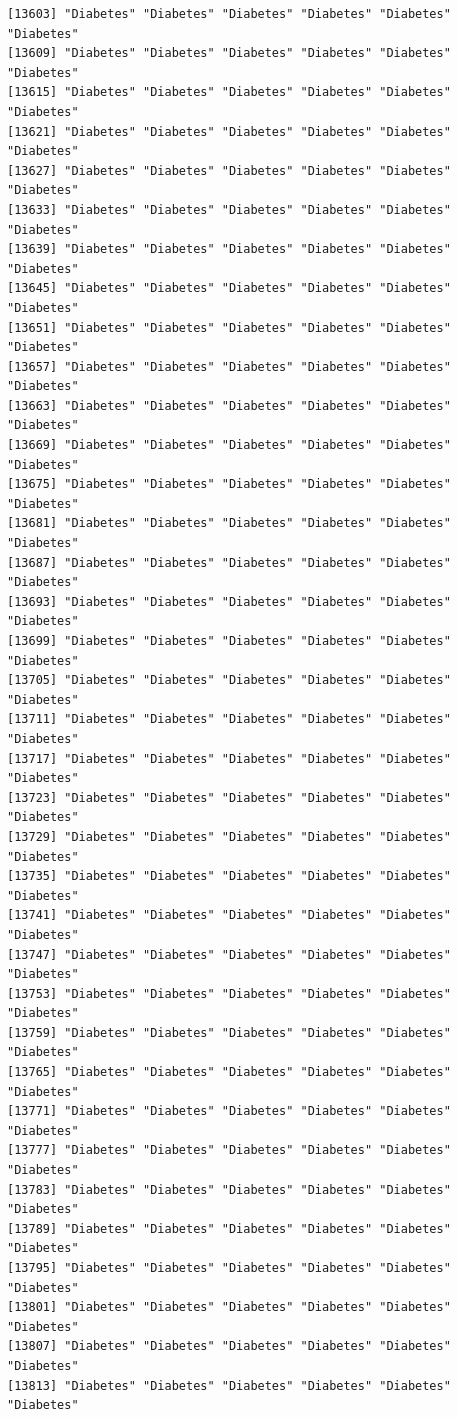 \documentclass[
  letterpaper,
  DIV=11,
  numbers=noendperiod]{scrartcl}
\begin{document}
\begin{verbatim}
[13603] "Diabetes" "Diabetes" "Diabetes" "Diabetes" "Diabetes" "Diabetes"
[13609] "Diabetes" "Diabetes" "Diabetes" "Diabetes" "Diabetes" "Diabetes"
[13615] "Diabetes" "Diabetes" "Diabetes" "Diabetes" "Diabetes" "Diabetes"
[13621] "Diabetes" "Diabetes" "Diabetes" "Diabetes" "Diabetes" "Diabetes"
[13627] "Diabetes" "Diabetes" "Diabetes" "Diabetes" "Diabetes" "Diabetes"
[13633] "Diabetes" "Diabetes" "Diabetes" "Diabetes" "Diabetes" "Diabetes"
[13639] "Diabetes" "Diabetes" "Diabetes" "Diabetes" "Diabetes" "Diabetes"
[13645] "Diabetes" "Diabetes" "Diabetes" "Diabetes" "Diabetes" "Diabetes"
[13651] "Diabetes" "Diabetes" "Diabetes" "Diabetes" "Diabetes" "Diabetes"
[13657] "Diabetes" "Diabetes" "Diabetes" "Diabetes" "Diabetes" "Diabetes"
[13663] "Diabetes" "Diabetes" "Diabetes" "Diabetes" "Diabetes" "Diabetes"
[13669] "Diabetes" "Diabetes" "Diabetes" "Diabetes" "Diabetes" "Diabetes"
[13675] "Diabetes" "Diabetes" "Diabetes" "Diabetes" "Diabetes" "Diabetes"
[13681] "Diabetes" "Diabetes" "Diabetes" "Diabetes" "Diabetes" "Diabetes"
[13687] "Diabetes" "Diabetes" "Diabetes" "Diabetes" "Diabetes" "Diabetes"
[13693] "Diabetes" "Diabetes" "Diabetes" "Diabetes" "Diabetes" "Diabetes"
[13699] "Diabetes" "Diabetes" "Diabetes" "Diabetes" "Diabetes" "Diabetes"
[13705] "Diabetes" "Diabetes" "Diabetes" "Diabetes" "Diabetes" "Diabetes"
[13711] "Diabetes" "Diabetes" "Diabetes" "Diabetes" "Diabetes" "Diabetes"
[13717] "Diabetes" "Diabetes" "Diabetes" "Diabetes" "Diabetes" "Diabetes"
[13723] "Diabetes" "Diabetes" "Diabetes" "Diabetes" "Diabetes" "Diabetes"
[13729] "Diabetes" "Diabetes" "Diabetes" "Diabetes" "Diabetes" "Diabetes"
[13735] "Diabetes" "Diabetes" "Diabetes" "Diabetes" "Diabetes" "Diabetes"
[13741] "Diabetes" "Diabetes" "Diabetes" "Diabetes" "Diabetes" "Diabetes"
[13747] "Diabetes" "Diabetes" "Diabetes" "Diabetes" "Diabetes" "Diabetes"
[13753] "Diabetes" "Diabetes" "Diabetes" "Diabetes" "Diabetes" "Diabetes"
[13759] "Diabetes" "Diabetes" "Diabetes" "Diabetes" "Diabetes" "Diabetes"
[13765] "Diabetes" "Diabetes" "Diabetes" "Diabetes" "Diabetes" "Diabetes"
[13771] "Diabetes" "Diabetes" "Diabetes" "Diabetes" "Diabetes" "Diabetes"
[13777] "Diabetes" "Diabetes" "Diabetes" "Diabetes" "Diabetes" "Diabetes"
[13783] "Diabetes" "Diabetes" "Diabetes" "Diabetes" "Diabetes" "Diabetes"
[13789] "Diabetes" "Diabetes" "Diabetes" "Diabetes" "Diabetes" "Diabetes"
[13795] "Diabetes" "Diabetes" "Diabetes" "Diabetes" "Diabetes" "Diabetes"
[13801] "Diabetes" "Diabetes" "Diabetes" "Diabetes" "Diabetes" "Diabetes"
[13807] "Diabetes" "Diabetes" "Diabetes" "Diabetes" "Diabetes" "Diabetes"
[13813] "Diabetes" "Diabetes" "Diabetes" "Diabetes" "Diabetes" "Diabetes"

\end{verbatim}
\end{document}
